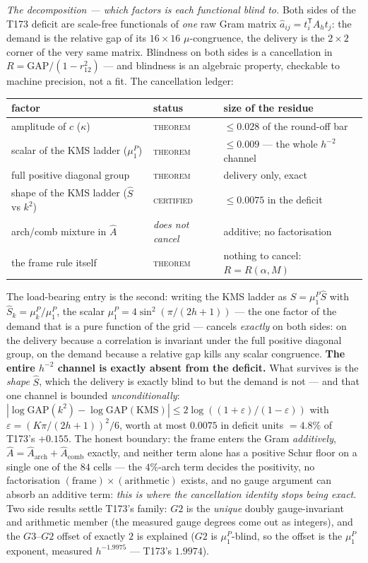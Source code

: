 \documentclass[11pt,a4paper]{article}
\begin{document}
\emph{The decomposition --- which factors is each functional blind to.}
Both sides of the T173 deficit are scale-free functionals of \emph{one}
raw Gram matrix $\hat a_{ij}=t_i^{\mathsf T}A_ht_j$: the demand is the
relative gap of its $16\times16$ $\mu$-congruence, the delivery is the
$2\times2$ corner of the very same matrix. Blindness on both sides is a
cancellation in $R=\mathrm{GAP}/(1-r_{12}^2)$ --- and blindness is an
algebraic property, checkable to machine precision, not a fit. The
cancellation ledger:
\begin{center}\small
\begin{tabular}{@{}l l l@{}}
\toprule
\textbf{factor} & \textbf{status} & \textbf{size of the residue}\\
\midrule
amplitude of $c$ ($\kappa$) & \textsc{theorem} & $\le0.028$ of the round-off bar\\
scalar of the KMS ladder ($\mu^P_1$) & \textsc{theorem} & $\le0.009$ --- the whole $h^{-2}$ channel\\
full positive diagonal group & \textsc{theorem} & delivery only, exact\\
shape of the KMS ladder ($\hat S$ vs $k^2$) & \textsc{certified} & $\le0.0075$ in the deficit\\
arch/comb mixture in $\hat A$ & \emph{does not cancel} & additive; no factorisation\\
the frame rule itself & \textsc{theorem} & nothing to cancel: $R=R(\alpha,M)$\\
\bottomrule
\end{tabular}
\end{center}
\noindent The load-bearing entry is the second: writing the KMS ladder
as $S=\mu^P_1\hat S$ with $\hat S_k=\mu^P_k/\mu^P_1$, the scalar
$\mu^P_1=4\sin^2(\pi/(2h+1))$ --- the one factor of the demand that is
a pure function of the grid --- cancels \emph{exactly} on both sides:
on the delivery because a correlation is invariant under the full
positive diagonal group, on the demand because a relative gap kills any
scalar congruence. \textbf{The entire $h^{-2}$ channel is exactly
absent from the deficit.} What survives is the \emph{shape} $\hat S$,
which the delivery is exactly blind to but the demand is not --- and
that one channel is bounded \emph{unconditionally}:
$|\log\mathrm{GAP}(k^2)-\log\mathrm{GAP}(\mathrm{KMS})|\le
2\log((1+\varepsilon)/(1-\varepsilon))$ with
$\varepsilon=(K\pi/(2h+1))^2/6$, worth at most $0.0075$ in deficit
units $=4.8\%$ of T173's $+0.155$. The honest boundary: the frame
enters the Gram \emph{additively}, $\hat A=\hat A_{\mathrm{arch}}+\hat
A_{\mathrm{comb}}$ exactly, and neither term alone has a positive Schur
floor on a single one of the $84$ cells --- the $4\%$-arch term decides
the positivity, no factorisation $(\mathrm{frame})\times(\mathrm{
arithmetic})$ exists, and no gauge argument can absorb an additive
term: \emph{this is where the cancellation identity stops being exact}.
Two side results settle T173's family: $G2$ is the \emph{unique} doubly
gauge-invariant and arithmetic member (the measured gauge degrees come
out as integers), and the $G3$--$G2$ offset of exactly $2$ is explained
($G2$ is $\mu^P_1$-blind, so the offset is the $\mu^P_1$ exponent,
measured $h^{-1.9975}$ --- T173's $1.9974$).
\end{document}
